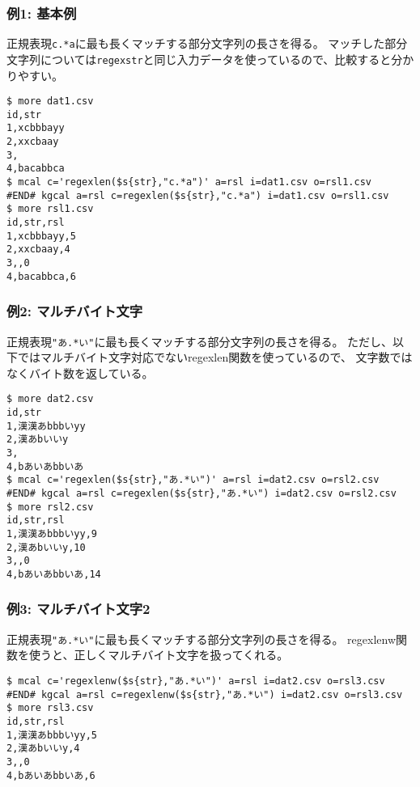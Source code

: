 \subsubsection*{例1: 基本例}

正規表現\verb|c.*a|に最も長くマッチする部分文字列の長さを得る。
マッチした部分文字列については\verb|regexstr|と同じ入力データを使っているので、比較すると分かりやすい。


\begin{Verbatim}[baselinestretch=0.7,frame=single]
$ more dat1.csv
id,str
1,xcbbbayy
2,xxcbaay
3,
4,bacabbca
$ mcal c='regexlen($s{str},"c.*a")' a=rsl i=dat1.csv o=rsl1.csv
#END# kgcal a=rsl c=regexlen($s{str},"c.*a") i=dat1.csv o=rsl1.csv
$ more rsl1.csv
id,str,rsl
1,xcbbbayy,5
2,xxcbaay,4
3,,0
4,bacabbca,6
\end{Verbatim}
\subsubsection*{例2: マルチバイト文字}

正規表現\verb|"あ.*い"|に最も長くマッチする部分文字列の長さを得る。
ただし、以下ではマルチバイト文字対応でないregexlen関数を使っているので、
文字数ではなくバイト数を返している。


\begin{Verbatim}[baselinestretch=0.7,frame=single]
$ more dat2.csv
id,str
1,漢漢あbbbいyy
2,漢あbいいy
3,
4,bあいあbbいあ
$ mcal c='regexlen($s{str},"あ.*い")' a=rsl i=dat2.csv o=rsl2.csv
#END# kgcal a=rsl c=regexlen($s{str},"あ.*い") i=dat2.csv o=rsl2.csv
$ more rsl2.csv
id,str,rsl
1,漢漢あbbbいyy,9
2,漢あbいいy,10
3,,0
4,bあいあbbいあ,14
\end{Verbatim}
\subsubsection*{例3: マルチバイト文字2}

正規表現\verb|"あ.*い"|に最も長くマッチする部分文字列の長さを得る。
regexlenw関数を使うと、正しくマルチバイト文字を扱ってくれる。


\begin{Verbatim}[baselinestretch=0.7,frame=single]
$ mcal c='regexlenw($s{str},"あ.*い")' a=rsl i=dat2.csv o=rsl3.csv
#END# kgcal a=rsl c=regexlenw($s{str},"あ.*い") i=dat2.csv o=rsl3.csv
$ more rsl3.csv
id,str,rsl
1,漢漢あbbbいyy,5
2,漢あbいいy,4
3,,0
4,bあいあbbいあ,6
\end{Verbatim}
